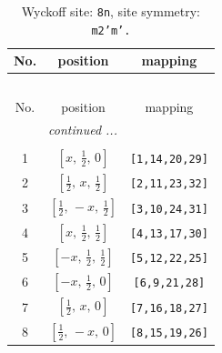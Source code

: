 \documentclass[fleqn,8pt]{jsarticle}
\begin{document}
\begin{longtable}{ccc}
\caption{Wyckoff site: {\tt 8n}, site symmetry: {\tt m2'm'.}}
 \\
 \hline \hline
No. & position & mapping \\ \hline \endfirsthead

\multicolumn{2}{l}{\tablename\ \thetable{}} \\
 \hline \hline
No. & position & mapping \\ \hline \endhead

 \hline \hline
\multicolumn{2}{r}{\footnotesize\it continued ...} \\ \endfoot

 \hline \hline
\multicolumn{2}{r}{} \\ \endlastfoot

1 & $\left[ x,\, \frac{1}{2},\, 0 \right]$ & {\tt [1,14,20,29]} \\ \hline
2 & $\left[ \frac{1}{2},\, x,\, \frac{1}{2} \right]$ & {\tt [2,11,23,32]} \\ \hline
3 & $\left[ \frac{1}{2},\, - x,\, \frac{1}{2} \right]$ & {\tt [3,10,24,31]} \\ \hline
4 & $\left[ x,\, \frac{1}{2},\, \frac{1}{2} \right]$ & {\tt [4,13,17,30]} \\ \hline
5 & $\left[ - x,\, \frac{1}{2},\, \frac{1}{2} \right]$ & {\tt [5,12,22,25]} \\ \hline
6 & $\left[ - x,\, \frac{1}{2},\, 0 \right]$ & {\tt [6,9,21,28]} \\ \hline
7 & $\left[ \frac{1}{2},\, x,\, 0 \right]$ & {\tt [7,16,18,27]} \\ \hline
8 & $\left[ \frac{1}{2},\, - x,\, 0 \right]$ & {\tt [8,15,19,26]} \\
\end{longtable}
\renewcommand{\arraystretch}{1.2}
\end{document}
